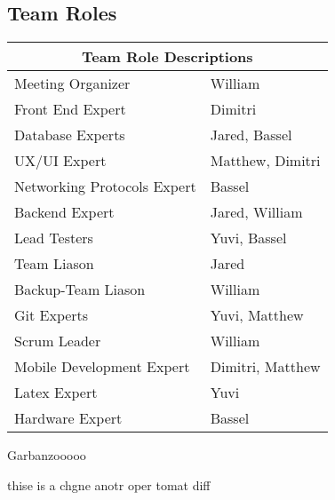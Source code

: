 \documentclass{article}
\begin{document}
\subsection{Team Roles}
\begin{tabular}{ |p{5cm}|p{8cm}| }
	\hline
	\multicolumn{2}{|c|}{Team Role Descriptions} \\
	\hline
	Meeting Organizer & William \\
	\hline
	Front End Expert & Dimitri \\
	\hline
	Database Experts  & Jared, Bassel \\
	\hline
	UX/UI Expert & Matthew, Dimitri \\
	\hline
	Networking Protocols Expert & Bassel \\
	\hline
	Backend Expert & Jared, William \\
	\hline
	Lead Testers & Yuvi, Bassel \\
	\hline
	Team Liason & Jared \\
	\hline
	Backup-Team Liason & William \\
	\hline
	Git Experts & Yuvi, Matthew\\
	\hline
	Scrum Leader & William \\
	\hline
	Mobile Development Expert & Dimitri, Matthew \\
	\hline
	Latex Expert & Yuvi \\
	\hline
	Hardware Expert & Bassel \\
	\hline
\end{tabular}

\subsdaksml

Garbanzooooo

thise is a chgne anotr oper tomat diff
\end{document}
